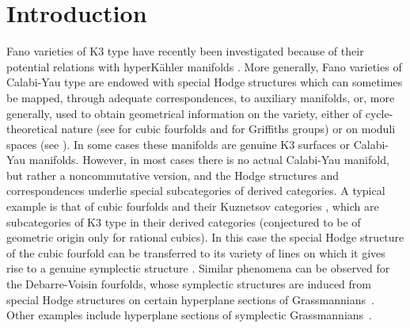 \Changel

\section{Introduction}

Fano varieties of K3 type have recently been investigated because of their potential
relations with hyperKähler manifolds \cite{debarre-voisin,fm,imcy}. More generally, Fano varieties of Calabi-Yau type
are endowed with special Hodge structures which can sometimes be mapped, through adequate correspondences,
to auxiliary manifolds, or, more generally, used to obtain geometrical information on the variety,
either of cycle-theoretical nature (see \cite{hassett:special-cubics} for cubic fourfolds and \cite{fik-griffiths} for
Griffiths groups) or on moduli spaces (see \cite{debarre-voisin}).
In some cases these manifolds are genuine K3 surfaces or Calabi-Yau
manifolds. However, in most cases there is no actual Calabi-Yau manifold, but rather a
noncommutative version,
and the Hodge structures and correspondences underlie special subcategories of derived categories. A typical example
is that of cubic fourfolds and their Kuznetsov categories \cite{kuz:4fold,at12}, which are subcategories of
K3 type in their derived categories (conjectured to be of geometric origin only for
rational cubics). In this case the special Hodge structure of the cubic fourfold can be
transferred to its variety of lines on which it gives rise to a genuine symplectic structure \cite{beauville-donagi}.
Similar phenomena can be observed for the Debarre-Voisin fourfolds, whose symplectic
structures are induced from special Hodge structures on certain hyperplane sections
of Grassmannians~\cite{debarre-voisin}. Other examples include hyperplane sections
of symplectic Grassmannians~\cite{fm}.


